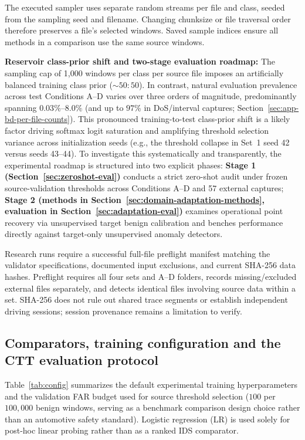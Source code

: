 \documentclass[12pt, a4paper, reqno, oneside]{book}
\begin{document}
The executed sampler uses separate random streams per file and class, seeded from the sampling seed and filename. Changing chunksize or file traversal order therefore preserves a file's selected windows. Saved sample indices ensure all methods in a comparison use the same source windows.

\noindent\textbf{Reservoir class-prior shift and two-stage evaluation roadmap:} The sampling cap of 1,000 windows per class per source file imposes an artificially balanced training class prior ($\sim 50:50$). In contrast, natural evaluation prevalence across test Conditions A--D varies over three orders of magnitude, predominantly spanning $0.03\%\text{--}8.0\%$ (and up to $97\%$ in DoS/interval captures; Section~\ref{sec:app-bd-per-file-counts}). This pronounced training-to-test class-prior shift is a likely factor driving softmax logit saturation and amplifying threshold selection variance across initialization seeds (e.g., the threshold collapse in Set~1 seed 42 versus seeds 43--44). To investigate this systematically and transparently, the experimental roadmap is structured into two explicit phases: \textbf{Stage 1 (Section~\ref{sec:zeroshot-eval})} conducts a strict zero-shot audit under frozen source-validation thresholds across Conditions A--D and 57 external captures; \textbf{Stage 2 (methods in Section~\ref{sec:domain-adaptation-methods}, evaluation in Section~\ref{sec:adaptation-eval})} examines operational point recovery via unsupervised target benign calibration and benches performance directly against target-only unsupervised anomaly detectors.

Research runs require a successful full-file preflight manifest matching the validator specifications, documented input exclusions, and current SHA-256 data hashes. Preflight requires all four sets and A--D folders, records missing/excluded external files separately, and detects identical files involving source data within a set. SHA-256 does not rule out shared trace segments or establish independent driving sessions; session provenance remains a limitation to verify.

\subsection{Comparators, training configuration and the CTT evaluation protocol}\label{sec:comparison-protocol}
Table~\ref{tab:config} summarizes the default experimental training hyperparameters and the validation FAR budget used for source threshold selection ($100$ per $100{,}000$ benign windows, serving as a benchmark comparison design choice rather than an automotive safety standard). Logistic regression (LR) is used solely for post-hoc linear probing rather than as a ranked IDS comparator.
\end{document}
